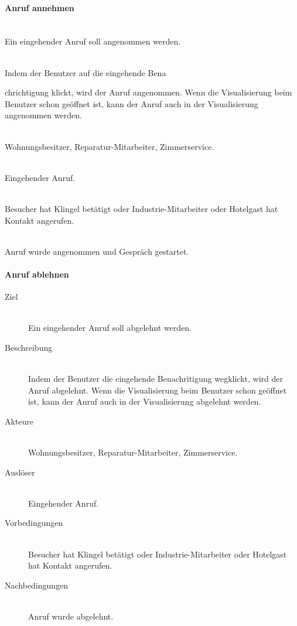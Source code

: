 \paragraph{Anruf annehmen}
    \begin{description}
        \item[Ziel]\hfill \\
        Ein eingehender Anruf soll angenommen werden.
        \item[Beschreibung]\hfill \\
        Indem der Benutzer auf die eingehende Bena
        \item chrichtigung klickt, wird der Anruf angenommen.
        Wenn die Visualisierung beim Benutzer schon geöffnet ist, kann der Anruf auch in der Visualisierung angenommen werden.
        \item[Akteure]\hfill \\
        Wohnungsbesitzer, Reparatur-Mitarbeiter, Zimmerservice.
        \item[Auslöser]\hfill \\
        Eingehender Anruf.
        \item[Vorbedingungen]\hfill \\
        Besucher hat Klingel betätigt oder Industrie-Mitarbeiter oder Hotelgast hat Kontakt angerufen.
        \item[Nachbedingungen]\hfill \\
        Anruf wurde angenommen und Gespräch gestartet.
        \end{description}

\paragraph{Anruf ablehnen}
    \begin{description}
        \item[Ziel]\hfill \\
        Ein eingehender Anruf soll abgelehnt werden.
        \item[Beschreibung]\hfill \\
        Indem der Benutzer die eingehende Benachritigung wegklickt, wird der Anruf abgelehnt.
        Wenn die Visualisierung beim Benutzer schon geöffnet ist, kann der Anruf auch in der Visualisierung abgelehnt werden.
        \item[Akteure]\hfill \\
        Wohnungsbesitzer, Reparatur-Mitarbeiter, Zimmerservice.
        \item[Auslöser]\hfill \\
        Eingehender Anruf.
        \item[Vorbedingungen]\hfill \\
        Besucher hat Klingel betätigt oder Industrie-Mitarbeiter oder Hotelgast hat Kontakt angerufen.
        \item[Nachbedingungen]\hfill \\
        Anruf wurde abgelehnt.
        \end{description}

